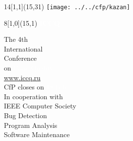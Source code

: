\documentclass{article}
\begin{document}
\selectfont
\raggedbottom
\raggedright
\setlength{\topskip}{6pt}
\setlength{\parindent}{0pt} %
\setlength{\parskip}{6pt} %
\color{xblack}

\newcommand\invert[1]{\colorbox{xred}{\textcolor{white}{#1}}}

\begin{textblock}{14}[1,1](15,31)
  \raggedleft
  \texttt{[image: ../../cfp/kazan]}
\end{textblock}

\begin{textblock}{8}[1,0](15,1)
  \raggedleft
  \invert{\fontsize{64}{64}\selectfont\bfseries ICCQ}\\[24pt]
\end{textblock}

\fontsize{24}{24}\selectfont\bfseries

\vspace*{48pt}
The 4th \\
International \\
Conference \\
on \invert{Code Quality}\\[24pt]

\underline{www.iccq.ru}\\[24pt]

\textcolor{xred}{CfP closes on \invert{18 Feb}}\\[24pt]

In cooperation with \\
IEEE Computer Society\\[24pt]

Bug Detection \\
Program Analysis \\
Software Maintenance
\end{document}
